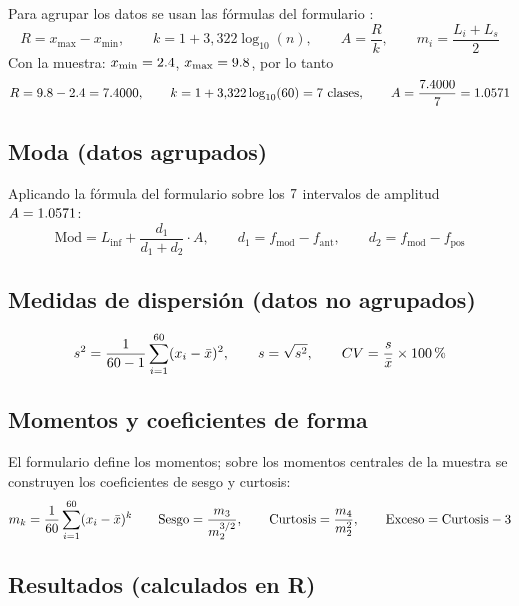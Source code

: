 \documentclass[11pt,a4paper]{article}
\newcommand{\FP}{\text{[F]}}
\begin{document}
Para agrupar los datos se usan las fórmulas del formulario \FP:
\[
R = x_{\max}-x_{\min},
\qquad
k = 1 + 3{,}322\log_{10}(n),
\qquad
A = \frac{R}{k},
\qquad
m_i = \frac{L_i+L_s}{2}
\]
Con la muestra: $x_{\min}=2.4$, $x_{\max}=9.8$, por lo tanto
\[
R = 9.8-2.4 = 7.4000,
\qquad
k = 1+3{,}322\log_{10}(60) = 7\ \text{clases},
\qquad
A = \frac{7.4000}{7} = 1.0571
\]

\subsection{Moda (datos agrupados)}

Aplicando la fórmula del formulario sobre los $7$ intervalos de
amplitud $A=1.0571$:
\[
\text{Mod} = L_{\inf} + \frac{d_1}{d_1+d_2}\cdot A,
\qquad d_1 = f_{\text{mod}} - f_{\text{ant}},
\qquad d_2 = f_{\text{mod}} - f_{\text{pos}}
\]

\subsection{Medidas de dispersión (datos no agrupados)}

\[
s^{2} = \frac{1}{60-1}\sum_{i=1}^{60}(x_i-\bar{x})^{2},
\qquad
s = \sqrt{s^{2}},
\qquad
CV = \frac{s}{\bar{x}}\times 100\,\text{\%}
\]

\subsection{Momentos y coeficientes de forma}

El formulario define los momentos; sobre los momentos centrales de la muestra
se construyen los coeficientes de sesgo y curtosis:
\[
m_k = \frac{1}{60}\sum_{i=1}^{60}(x_i-\bar{x})^{k}
\qquad
\text{Sesgo} = \frac{m_3}{m_2^{3/2}},
\qquad
\text{Curtosis} = \frac{m_4}{m_2^{2}},
\qquad
\text{Exceso} = \text{Curtosis} - 3
\]

\subsection{Resultados (calculados en R)}
\end{document}

